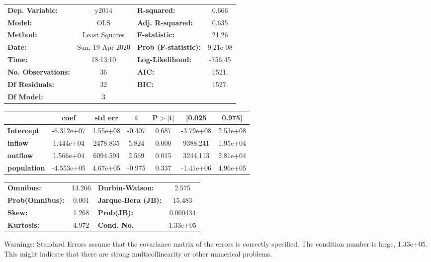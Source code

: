 \begin{center}
\begin{tabular}{lclc}
\toprule
\textbf{Dep. Variable:}    &      y2014       & \textbf{  R-squared:         } &     0.666   \\
\textbf{Model:}            &       OLS        & \textbf{  Adj. R-squared:    } &     0.635   \\
\textbf{Method:}           &  Least Squares   & \textbf{  F-statistic:       } &     21.26   \\
\textbf{Date:}             & Sun, 19 Apr 2020 & \textbf{  Prob (F-statistic):} &  9.21e-08   \\
\textbf{Time:}             &     18:13:10     & \textbf{  Log-Likelihood:    } &   -756.45   \\
\textbf{No. Observations:} &          36      & \textbf{  AIC:               } &     1521.   \\
\textbf{Df Residuals:}     &          32      & \textbf{  BIC:               } &     1527.   \\
\textbf{Df Model:}         &           3      & \textbf{                     } &             \\
\bottomrule
\end{tabular}
\begin{tabular}{lcccccc}
                    & \textbf{coef} & \textbf{std err} & \textbf{t} & \textbf{P$> |$t$|$} & \textbf{[0.025} & \textbf{0.975]}  \\
\midrule
\textbf{Intercept}  &   -6.312e+07  &     1.55e+08     &    -0.407  &         0.687        &    -3.79e+08    &     2.53e+08     \\
\textbf{inflow}     &    1.444e+04  &     2478.835     &     5.824  &         0.000        &     9388.241    &     1.95e+04     \\
\textbf{outflow}    &    1.566e+04  &     6094.594     &     2.569  &         0.015        &     3244.113    &     2.81e+04     \\
\textbf{population} &   -4.553e+05  &     4.67e+05     &    -0.975  &         0.337        &    -1.41e+06    &     4.96e+05     \\
\bottomrule
\end{tabular}
\begin{tabular}{lclc}
\textbf{Omnibus:}       & 14.266 & \textbf{  Durbin-Watson:     } &    2.575  \\
\textbf{Prob(Omnibus):} &  0.001 & \textbf{  Jarque-Bera (JB):  } &   15.483  \\
\textbf{Skew:}          &  1.268 & \textbf{  Prob(JB):          } & 0.000434  \\
\textbf{Kurtosis:}      &  4.972 & \textbf{  Cond. No.          } & 1.33e+05  \\
\bottomrule
\end{tabular}
\end{center}

Warnings: \newline
 [1] Standard Errors assume that the covariance matrix of the errors is correctly specified. \newline
 [2] The condition number is large, 1.33e+05. This might indicate that there are \newline
 strong multicollinearity or other numerical problems.